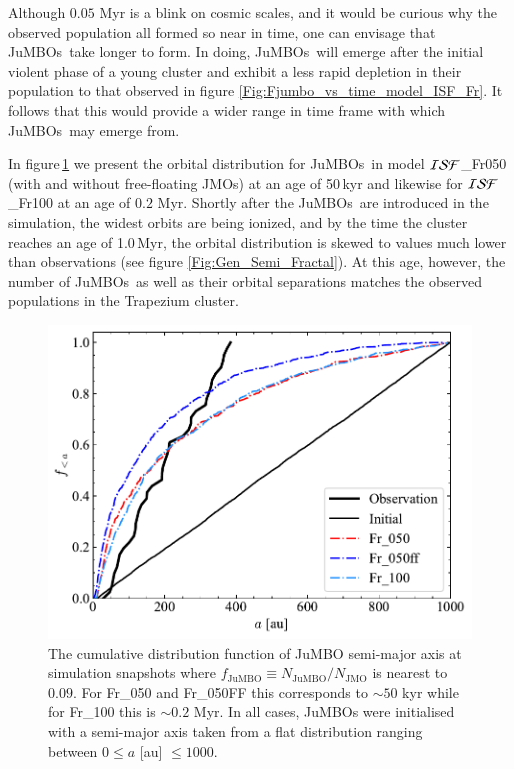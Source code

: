 \documentclass[submission,phys]{lib/SciPost}
\newcommand{\jumbos}{\mbox{JuMBOs}}
\begin{document}
Although $0.05$ Myr is a blink on cosmic 
scales, and it would be curious why the observed population all formed so near 
in time, one can envisage that \jumbos\ take longer to form. In doing, \jumbos\ 
will emerge after the initial violent phase of a young cluster and exhibit a  
less rapid depletion in their population to that observed in figure  
\ref{Fig:Fjumbo_vs_time_model_ISF_Fr}. It follows that this would provide a  
wider range in time frame with which \jumbos\ may emerge from.

In figure\,\ref{Fig:sma_vs_time_model_ISF_FrA} we present the orbital
distribution for \jumbos\, in model ${\cal ISF}$\_Fr050 (with and
without free-floating JMOs) at an age of 50\,kyr and likewise for ${\cal ISF}$\_Fr100 at an age of $0.2$ Myr. Shortly after the
\jumbos\, are introduced in the simulation, the widest orbits are
being ionized, and by the time the cluster reaches an age of 1.0\,Myr,
the orbital distribution is skewed to values much lower than observations (see figure \ref{Fig:Gen_Semi_Fractal}). At this age, however, the number of \jumbos\, as
well as their orbital separations matches the observed populations in
the Trapezium cluster. 

\begin{figure}
    \centering
    \includegraphics[width=\columnwidth]{figures/Fractal_General_sem_axis_crop.pdf}
    \caption{
    The cumulative distribution function of JuMBO semi-major axis at simulation snapshots where $f_{\mathrm{JuMBO}}\equiv{N_{\mathrm{JuMBO}}}/{N_{\mathrm{JMO}}}$ is nearest to $0.09$. For Fr\_050 and Fr\_050FF this corresponds to $\sim 50$ kyr while for Fr\_100 this is $\sim0.2$ Myr. In all cases, JuMBOs were initialised with a semi-major axis taken from a flat distribution ranging between $0\leq a$ [au] $\leq 1000$.
    }
        \label{Fig:sma_vs_time_model_ISF_FrA}
\end{figure}
\end{document}
